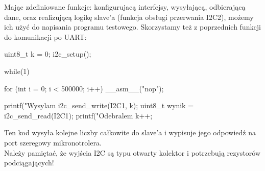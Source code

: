 \documentclass{pdfBooklets}
\begin{document}
Mając zdefiniowane funkcje: konfigurujacą interfejsy, wysyłającą, odbierającą dane, oraz realizującą logikę slave'a (funkcja obsługi przerwania I2C2),
możemy ich użyć do napisania programu testowego. Skorzystamy też z poprzednich funkcji do komunikacji po UART:

\begin{CodeFrame*}[c]{}
  uint8_t k = 0;
  i2c_setup();

  while(1){
    for (int i = 0; i < 500000; i++) __asm__("nop");
    
    printf("Wysylam %
    i2c_send_write(I2C1, k);    
    uint8_t wynik = i2c_send_read(I2C1);
    printf("Odebralem %
    k++;

  }
\end{CodeFrame*}

Ten kod wysyła kolejne liczby całkowite do slave'a i wypisuje jego odpowiedź na port szeregowy mikronotrolera.\\

Należy pamiętać, że wyjścia I2C są typu otwarty kolektor i potrzebują rezystorów podciągających!

\end{document}
